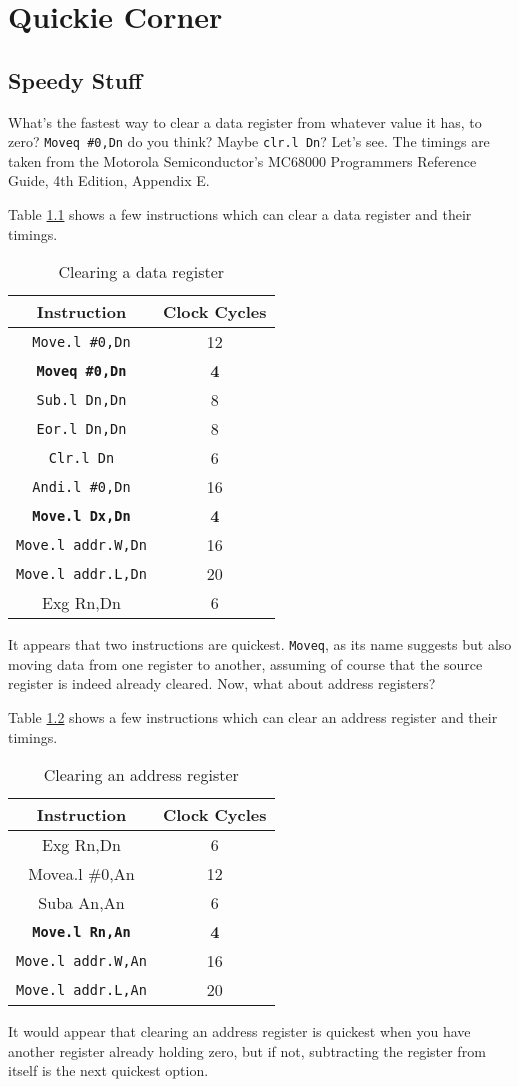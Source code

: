 
\chapter{Quickie Corner}

\section{Speedy Stuff}

What's the fastest way to clear a data register from whatever value
it has, to zero? \texttt{Moveq \#0,Dn} do you think? Maybe \texttt{clr.l
Dn}? Let's see. The timings are taken from the Motorola Semiconductor's
MC68000 Programmers Reference Guide, 4th Edition, Appendix E.

Table \ref{tab:Clearing-a-data-register} shows a few instructions
which can clear a data register and their timings.

\begin{table}[!h]
\begin{centering}
\begin{tabular}{|c|c|}
\hline 
\textbf{Instruction} & \textbf{Clock Cycles}\tabularnewline
\hline 
\hline 
\texttt{Move.l \#0,Dn} & 12\tabularnewline
\hline 
\texttt{\textbf{Moveq \#0,Dn}} & \textbf{4}\tabularnewline
\hline 
\texttt{Sub.l Dn,Dn} & 8\tabularnewline
\hline 
\texttt{Eor.l Dn,Dn} & 8\tabularnewline
\hline 
\texttt{Clr.l Dn} & 6\tabularnewline
\hline 
\texttt{Andi.l \#0,Dn} & 16\tabularnewline
\hline 
\texttt{\textbf{Move.l Dx,Dn}} & \textbf{4}\tabularnewline
\hline 
\texttt{Move.l addr.W,Dn} & 16\tabularnewline
\hline 
\texttt{Move.l addr.L,Dn} & 20\tabularnewline
\hline 
Exg Rn,Dn & 6\tabularnewline
\hline 
\end{tabular}
\par\end{centering}
\caption{Clearing a data register\label{tab:Clearing-a-data-register}}

\end{table}

It appears that two instructions are quickest. \texttt{Moveq}, as
its name suggests but also moving data from one register to another,
assuming of course that the source register is indeed already cleared.
Now, what about address registers?

Table \ref{tab:Clearing-an-address-register} shows a few instructions
which can clear an address register and their timings.

\begin{table}[!h]
\begin{centering}
\begin{tabular}{|c|c|}
\hline 
\textbf{Instruction} & \textbf{Clock Cycles}\tabularnewline
\hline 
\hline 
Exg Rn,Dn & 6\tabularnewline
\hline 
Movea.l \#0,An & 12\tabularnewline
\hline 
Suba An,An & 6\tabularnewline
\hline 
\texttt{\textbf{Move.l Rn,An}} & \textbf{4}\tabularnewline
\hline 
\texttt{Move.l addr.W,An} & 16\tabularnewline
\hline 
\texttt{Move.l addr.L,An} & 20\tabularnewline
\hline 
\end{tabular}
\par\end{centering}
\caption{Clearing an address register\label{tab:Clearing-an-address-register}}
\end{table}

It would appear that clearing an address register is quickest when
you have another register already holding zero, but if not, subtracting
the register from itself is the next quickest option.
